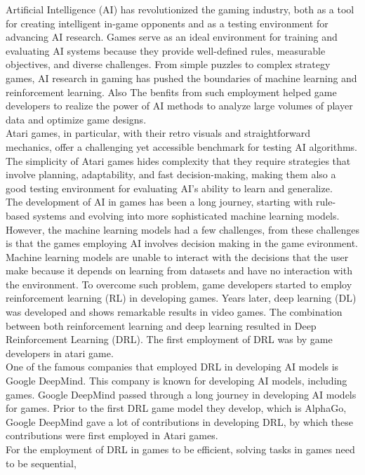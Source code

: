 Artificial Intelligence (AI) has revolutionized the gaming industry, 
both as a tool for creating intelligent in-game opponents and as a 
testing environment for advancing AI research. Games serve as an ideal 
environment for training and evaluating AI systems because they provide 
well-defined rules, measurable objectives, and diverse challenges. From 
simple puzzles to complex strategy games, AI research in gaming has pushed 
the boundaries of machine learning and reinforcement learning.
Also The benfits from such employment helped game developers to realize 
the power of AI methods to analyze large volumes of player data and optimize 
game designs. \cite{I1} \\
Atari games, in particular, with their retro visuals and straightforward mechanics, 
offer a challenging yet accessible benchmark for testing AI algorithms. The simplicity 
of Atari games hides complexity that they require strategies that involve planning, 
adaptability, and fast decision-making, making them also a good testing environment for 
evaluating AI's ability to learn and generalize.\\
The development of AI in games has been a long journey, starting with rule-based systems 
and evolving into more sophisticated machine learning models. However, the machine 
learning models had a few challenges, from these challenges is that the games employing 
AI involves decision making in the game evironment. Machine learning models are unable 
to interact with the decisions that the user make because it depends on learning from 
datasets and have no interaction with the environment. To overcome such problem, 
game developers started to employ reinforcement learning (RL) in developing games. 
Years later, deep learning (DL) was developed and shows remarkable results in video games\cite{I2}. 
The combination between both reinforcement learning and deep learning resulted in Deep Reinforcement 
Learning (DRL). The first employment of DRL was by game developers in atari game\cite{I3}.\\
One of the famous companies that employed DRL in developing AI models is Google DeepMind. 
This company is known for developing AI models, including games. Google DeepMind passed through a 
long journey in developing AI models for games. Prior to the first DRL game model they develop, 
which is AlphaGo, Google DeepMind gave a lot of contributions in developing DRL, by which these 
contributions were first employed in Atari games.\\
For the employment of DRL in games to be efficient, solving tasks in games need to be sequential, 
